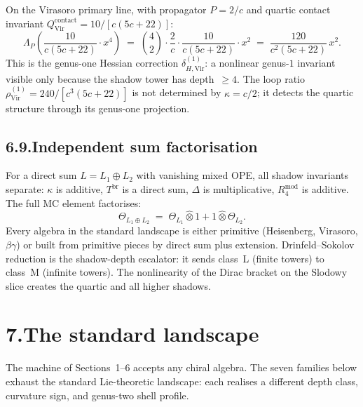 On the Virasoro primary line, with propagator $P=2/c$ and
quartic contact invariant $Q^{\mathrm{contact}}_{\mathrm{Vir}}
=10/[c(5c{+}22)]$:
\[
\Lambda_P\!\left(\frac{10}{c(5c{+}22)}\cdot x^4\right)
\;=\;
\binom{4}{2}\cdot\frac{2}{c}\cdot
\frac{10}{c(5c{+}22)}\cdot x^2
\;=\;
\frac{120}{c^2(5c{+}22)}\,x^2.
\]
This is the genus-one Hessian correction
$\delta_{H,\mathrm{Vir}}^{(1)}$: a nonlinear genus-$1$
invariant visible only because the shadow tower has depth~$\ge 4$.
The loop ratio
$\rho^{(1)}_{\mathrm{Vir}}
=240/[c^3(5c{+}22)]$
is not determined by $\kappa=c/2$; it detects the quartic
structure through its genus-one projection.

\subsection*{6.9.\enspace Independent sum factorisation}

For a direct sum $L=L_1\oplus L_2$ with vanishing mixed OPE,
all shadow invariants separate: $\kappa$ is additive,
$T^{\mathrm{br}}$ is a direct sum, $\Delta$ is multiplicative,
$R_4^{\mathrm{mod}}$ is additive. The full MC element factorises:
\[
\Theta_{L_1\oplus L_2}
\;=\;
\Theta_{L_1}\hat\otimes 1+1\hat\otimes\Theta_{L_2}.
\]
Every algebra in the standard landscape is either primitive
(Heisenberg, Virasoro, $\beta\gamma$) or built from primitive
pieces by direct sum plus extension. Drinfeld--Sokolov reduction
is the shadow-depth escalator: it sends class~L (finite towers)
to class~M (infinite towers). The nonlinearity of the Dirac
bracket on the Slodowy slice creates the quartic and all higher
shadows.


\section*{7.\quad The standard landscape}

The machine of Sections~1--6 accepts any chiral algebra. The
seven families below exhaust the standard Lie-theoretic landscape:
each realises a different depth class, curvature sign, and
genus-two shell profile.

